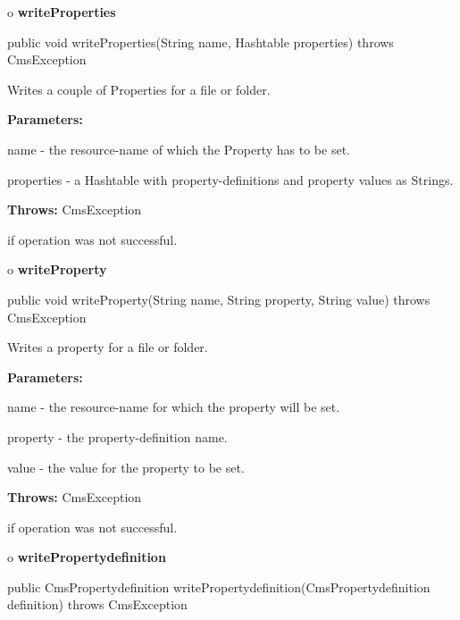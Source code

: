 o {\bf writeProperties} 

\begin{PRE}
 public void writeProperties(String name,
                             Hashtable properties) throws CmsException
\end{PRE}

\begin{description}
\htmlDD Writes a couple of Properties for a file or folder. 

\begin{description}
\item {\bf Parameters:}  

name - the resource-name of which the Property has to be set.  

properties - a Hashtable with property-definitions and property values as
Strings.  
\item {\bf Throws:} CmsException  

if operation was not successful.  
\end{description}

\end{description}

o {\bf writeProperty} 

\begin{PRE}
 public void writeProperty(String name,
                           String property,
                           String value) throws CmsException
\end{PRE}

\begin{description}
\htmlDD Writes a property for a file or folder. 

\begin{description}
\item {\bf Parameters:}  

name - the resource-name for which the property will be set.  

property - the property-definition name.  

value - the value for the property to be set.  
\item {\bf Throws:} CmsException  

if operation was not successful.  
\end{description}

\end{description}

o {\bf writePropertydefinition} 

\begin{PRE}
 public CmsPropertydefinition writePropertydefinition(CmsPropertydefinition definition) throws CmsException
\end{PRE}

